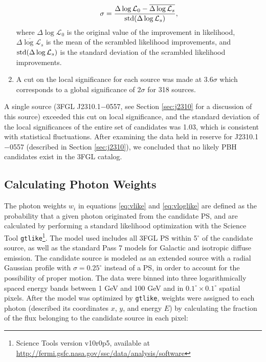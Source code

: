 \begin{enumerate}
\noindent
\begin{equation}
\sigma = \frac{\Delta \log \mathcal{L}_0 - \overline{\Delta \log \mathcal{L}_s}}{\textup{std}(\Delta \log \mathcal{L}_s)},
\end{equation}
where $\Delta \log \mathcal{L}_0$ is the original value of the improvement in likelihood, $\overline{\Delta \log \mathcal{L}_s}$ is the mean of the scrambled likelihood improvements, and $\textup{std}(\Delta \log \mathcal{L}_s)$ is the standard deviation of the scrambled likelihood improvements.
\item
A cut on the local significance for each source was made at $3.6 \sigma$ which corresponds to a global significance of $2 \sigma$ for 318 sources. 
\end{enumerate}
A single source (3FGL J2310.1$-$0557, see Section \ref{sec:j2310} for a discussion of this source) exceeded this cut on local significance, and the standard deviation of the local significances of the entire set of candidates was 1.03, which is consistent with statistical fluctuations. After examining the data held in reserve for J2310.1$-$0557 (described in Section \ref{sec:j2310}), we concluded that no likely PBH candidates exist in the 3FGL catalog.


\subsection{Calculating Photon Weights}
\label{sec:likelihood}

The photon weights $w_i$ in equations \ref{eq:vlike} and \ref{eq:vloglike} are defined as the probability that a given photon originated from the candidate PS, and are calculated by performing a standard likelihood optimization with the \Fermi Science Tool {\tt gtlike}\footnote{Science Tools version v10r0p5, available at \url{http://fermi.gsfc.nasa.gov/ssc/data/analysis/software}}.
The model used includes all 3FGL PS within 5$^\circ$ of the candidate source, as well as the standard Pass 7 models for Galactic and isotropic diffuse emission.
The candidate source is modeled as an extended source with a radial Gaussian profile with $\sigma=0.25^\circ$ instead of a PS, in order to account for the possibility of proper motion.
The data were binned into three logarithmically spaced energy bands between 1 GeV and 100 GeV and in $0.1^\circ \times 0.1^\circ$ spatial pixels.
After the model was optimized by {\tt gtlike}, weights were assigned to each photon (described its coordinates $x$, $y$, and energy $E$) by calculating the fraction of the flux belonging to the candidate source in each pixel:

